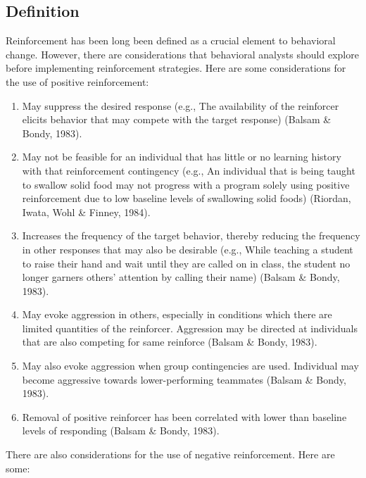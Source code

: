\subsection{Definition}
Reinforcement has been long been defined as a crucial element to behavioral change. However, there are considerations that behavioral analysts should explore before implementing reinforcement strategies. Here are some considerations for the use of positive reinforcement:
\begin{enumerate}
\item May suppress the desired response (e.g., The availability of the reinforcer elicits behavior that may compete with the target response) (Balsam \& Bondy, 1983). 
\item May not be feasible for an individual that has little or no learning history with that reinforcement contingency (e.g., An individual that is being taught to swallow solid food may not progress with a program solely using positive reinforcement due to low baseline levels of swallowing solid foods) (Riordan, Iwata, Wohl \& Finney, 1984).  
\item Increases the frequency of the target behavior, thereby reducing the frequency in other responses that may also be desirable (e.g., While teaching a student to raise their hand and wait until they are called on in class, the student no longer garners others' attention by calling their name) (Balsam \& Bondy, 1983). 
\item May evoke aggression in others, especially in conditions which there are limited quantities of the reinforcer. Aggression may be directed at individuals that are also competing for same reinforce (Balsam \& Bondy, 1983).
\item  May also evoke aggression when group contingencies are used. Individual may become aggressive towards lower-performing teammates (Balsam \& Bondy, 1983). 
\item Removal of positive reinforcer has been correlated with lower than baseline levels of responding (Balsam \& Bondy, 1983).
\end{enumerate}
%
There are also considerations for the use of negative reinforcement. Here are some:
